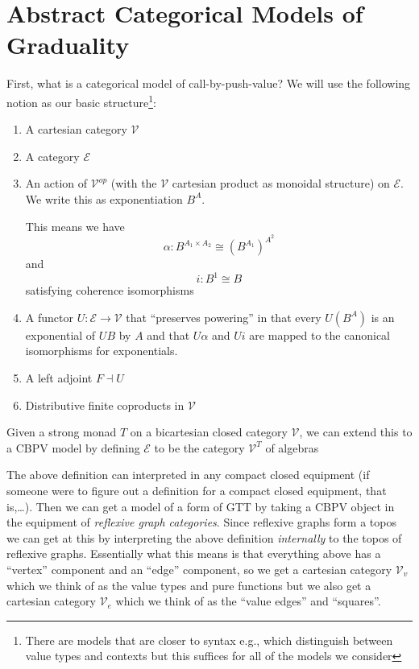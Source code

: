 \section{Abstract Categorical Models of Graduality}

First, what is a categorical model of call-by-push-value? We will use
the following notion as our basic structure\footnote{There are models
that are closer to syntax e.g., which distinguish between value types
and contexts but this suffices for all of the models we consider}:
\begin{enumerate}
\item A cartesian category $\mathcal V$
\item A category $\mathcal E$
\item An action of $\mathcal V^{op}$ (with the $\mathcal V$ cartesian
  product as monoidal structure) on $\mathcal E$. We write this as
  exponentiation $B^A$.

  This means we have 
  \[ \alpha : B^{A_1 \times A_2} \cong (B^{A_1})^{A^2} \]
  and
  \[ i : B^1 \cong B \]
  satisfying coherence isomorphisms
\item A functor $U : \mathcal E \to \mathcal V$ that ``preserves
  powering'' in that every $U(B^A)$ is an exponential of $UB$ by $A$
  and that $U\alpha$ and $Ui$ are mapped to the canonical isomorphisms
  for exponentials.
\item A left adjoint $F \dashv U$
\item Distributive finite coproducts in $\mathcal V$
\end{enumerate}

\begin{example}
  Given a strong monad $T$ on a bicartesian closed category $\mathcal
  V$, we can extend this to a CBPV model by defining $\mathcal E$ to
  be the category $\mathcal V^T$ of algebras
\end{example}

The above definition can interpreted in any compact closed equipment
(if someone were to figure out a definition for a compact closed
equipment, that is,\ldots). Then we can get a model of a form of GTT
by taking a CBPV object in the equipment of \emph{reflexive graph
categories}. Since reflexive graphs form a topos we can get at this by
interpreting the above definition \emph{internally} to the topos of
reflexive graphs. Essentially what this means is that everything above
has a ``vertex'' component and an ``edge'' component, so we get a
cartesian category $\mathcal V_v$ which we think of as the value types
and pure functions but we also get a cartesian category $\mathcal V_e$
which we think of as the ``value edges'' and ``squares''.

